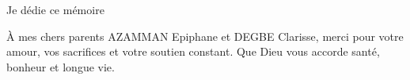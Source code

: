 \dedicace

\noindent Je dédie ce mémoire \vspace{0.5cm}

\hspace*{1.2cm} À mes chers parents AZAMMAN Epiphane et DEGBE Clarisse, merci pour votre amour, vos sacrifices et votre soutien constant. Que Dieu vous accorde santé, bonheur et longue vie.
